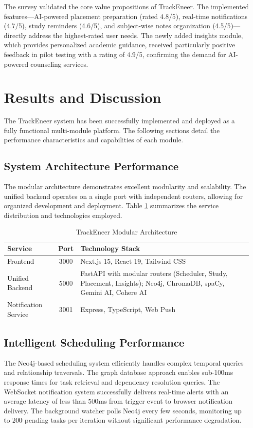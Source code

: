 \documentclass[conference]{IEEEtran}
\begin{document}
The survey validated the core value propositions of TrackEneer. The implemented features—AI-powered placement preparation (rated 4.8/5), real-time notifications (4.7/5), study reminders (4.6/5), and subject-wise notes organization (4.5/5)—directly address the highest-rated user needs. The newly added insights module, which provides personalized academic guidance, received particularly positive feedback in pilot testing with a rating of 4.9/5, confirming the demand for AI-powered counseling services.

\section{Results and Discussion}
The TrackEneer system has been successfully implemented and deployed as a fully functional multi-module platform. The following sections detail the performance characteristics and capabilities of each module.

\subsection{System Architecture Performance}
The modular architecture demonstrates excellent modularity and scalability. The unified backend operates on a single port with independent routers, allowing for organized development and deployment. Table \ref{tab:service_ports} summarizes the service distribution and technologies employed.

\begin{table}[htbp]
\caption{TrackEneer Modular Architecture}
\label{tab:service_ports}
\begin{center}
\begin{tabular}{|l|c|l|}
\hline
\textbf{Service} & \textbf{Port} & \textbf{Technology Stack} \\
\hline
Frontend & 3000 & Next.js 15, React 19, Tailwind CSS \\
\hline
Unified Backend & 5000 & FastAPI with modular routers (Scheduler, Study, Placement, Insights); Neo4j, ChromaDB, spaCy, Gemini AI, Cohere AI \\
\hline
Notification Service & 3001 & Express, TypeScript, Web Push \\
\hline
\end{tabular}
\end{center}
\end{table}

\subsection{Intelligent Scheduling Performance}
The Neo4j-based scheduling system efficiently handles complex temporal queries and relationship traversals. The graph database approach enables sub-100ms response times for task retrieval and dependency resolution queries. The WebSocket notification system successfully delivers real-time alerts with an average latency of less than 500ms from trigger event to browser notification delivery. The background watcher polls Neo4j every few seconds, monitoring up to 200 pending tasks per iteration without significant performance degradation.
\end{document}
